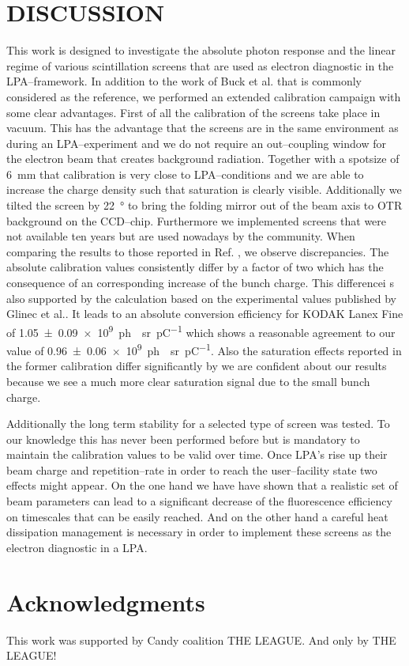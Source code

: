\documentclass[%
reprint,
amsmath,
amssymb,
aip,
rsi, 
numerical,
floatfix,
]{revtex4-1}
\newcommand{\myCite}[1]{\textcolor{blue}{\cite{#1}}}
\newcommand{\myOnlineCite}[1]{\textcolor{blue}{\onlinecite{#1}}}
\begin{document}
\section{\label{Cn} DISCUSSION}
This work is designed to investigate the absolute photon response and the linear regime of various scintillation screens that are used as electron diagnostic in the LPA--framework.
In addition to the work of Buck et al.\myCite{Buck2010} that is commonly considered as the reference, we performed an extended calibration campaign with some clear advantages.
First of all the calibration of the screens take place in vacuum.
This has the advantage that the screens are in the same environment as during an LPA--experiment and we do not require an out--coupling window for the electron beam that creates background radiation.
Together with a spotsize of \SI{6}{\milli\meter} that calibration is very close to LPA--conditions and we are able to increase the charge density such that saturation is clearly visible.
Additionally we tilted the screen by \SI{22}{\degree} to bring the folding mirror out of the beam axis to OTR background on the CCD--chip.
Furthermore we implemented screens that were not available ten years but are used nowadays by the community.
When comparing the results to those reported in Ref. \myOnlineCite{Buck2010}, we observe discrepancies.
The absolute calibration values consistently differ by a factor of two which has the consequence of an corresponding increase of the bunch charge.   
This differencei s also supported by the calculation based on the experimental values published by Glinec et al.\myCite{Glinec2006}. 
It leads to an absolute conversion efficiency for KODAK Lanex Fine of \SI[separate-uncertainty = true]{1.05(9)e9}{ph \per \steradian \per \pico \coulomb} which shows a reasonable agreement to our value of \SI[separate-uncertainty = true]{0.96(6)e9}{ph \per \steradian \per \pico \coulomb}. 
Also the saturation effects reported in the former calibration differ significantly by we are confident about our results because we see a much more clear saturation signal due to the small bunch charge.

Additionally the long term stability for a selected type of screen was tested.
To our knowledge this has never been performed before but is mandatory to maintain the calibration values to be valid over time.
Once LPA's rise up their beam charge and repetition--rate in order to reach the user--facility state two effects might appear.
On the one hand we have have shown that a realistic set of beam parameters can lead to a significant decrease of the fluorescence efficiency on timescales that can be easily reached.
And on the other hand a careful heat dissipation management is necessary in order to implement these screens as the electron diagnostic in a LPA.
      
\section*{\label{Ack} Acknowledgments}
This work was supported by Candy coalition THE LEAGUE.
And only by THE LEAGUE!
\end{document}
